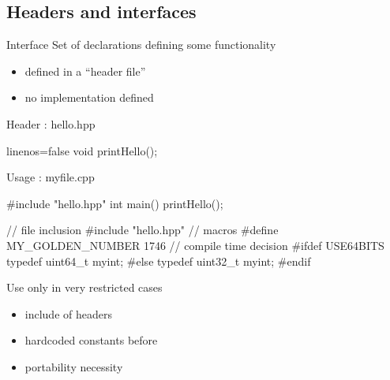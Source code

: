\subsection[.h]{Headers and interfaces}

\begin{frame}[fragile]
  \begin{block}{Interface}
    Set of declarations defining some functionality
    \begin{itemize}
    \item defined in a ``header file''
    \item no implementation defined
    \end{itemize}
  \end{block}
  \begin{block}{Header : hello.hpp}
    \begin{cppcode*}{linenos=false}
      void printHello();
    \end{cppcode*}
  \end{block}
  \begin{block}{Usage : myfile.cpp}
    \begin{cppcode*}{}
      #include "hello.hpp"
      int main() {
        printHello();
      }
    \end{cppcode*}
  \end{block}
\end{frame}

\begin{frame}[fragile]
  \begin{cppcode}
    // file inclusion
    #include "hello.hpp"
    // macros
    #define MY_GOLDEN_NUMBER 1746
    // compile time decision
    #ifdef USE64BITS
      typedef uint64_t myint;
    #else
      typedef uint32_t myint;
    #endif
  \end{cppcode}
  \pause
  \begin{block}{Use only in very restricted cases}
    \begin{itemize}
    \item include of headers
    \item hardcoded constants before 
    \item portability necessity
    \end{itemize}
  \end{block}
\end{frame}
